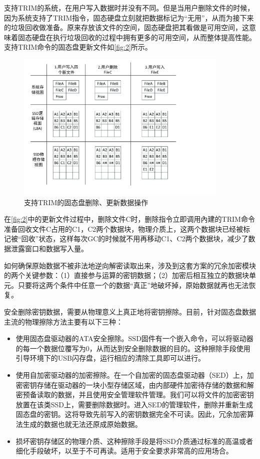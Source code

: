 支持TRIM的系统，在用户写入数据时并没有不同。但是当用户删除文件的时候，因为系统支持了TRIM指令，固态硬盘立刻就把数据标记为“无用”，从而为接下来的垃圾回收做准备。原来存放该文件的空间，固态硬盘把其看做是可用空间，这意味着固态硬盘在执行垃圾回收的过程中拥有更多的可用空间，从而整体提高性能。支持TRIM命令的固态盘更新文件如\autoref{fig:2}所示。
\begin{figure}[H]
	\centering
	\includegraphics[width=4in]{Pics/trim.pdf}
	\caption{支持TRIM的固态盘删除、更新数据操作}\label{fig:2}
\end{figure}
在\autoref{fig:2}中的更新文件过程中，删除文件C时，删除指令立即调用內建的TRIM命令准备回收文件C占用的C1，C2两个数据块，物理介质上，这两个数据块已经被标记被“回收”状态，这样每次GC的时候就不用再移动C1、C2两个数据块，减少了数据泄露窗口和数据写入量。


如何确保原始数据不被非法地逆向解密读取出来，涉及到这套方案的冗余加密模块的两个关键参数：（1）直接参与运算的密钥数据；（2）加密后相互独立的数据块单元。只要将这两个条件中任意一个的数据“真正”地破坏掉，原始数据就再也无法恢复。


安全删除密钥数据，需要从物理意义上真正地将密钥擦除。目前，针对固态盘数据主流的物理擦除方法主要有以下三种：
\begin{itemize}
	\item 使用固态盘驱动器的ATA安全擦除。SSD固件有一个嵌入命令，可以将驱动器的每一个数据位覆写为0，从而达到安全删除数据的目的。这种擦除手段使用引导环境下的USB闪存盘，运行相应的清除工具即可以进行。
	\item 使用自加密驱动器的加密擦除。在一个自加密的固态盘驱动器（SED）上，加密密钥存储在驱动器的一块小型存储区域，由内部硬件加密待存储的数据和解密预备读取的数据，并且使用安全管理软件管理。我们可以将文件的加密密钥放置在该类SSD上，需要删除数据时。进入SED的管理软件，删除并重新生成固态盘的密钥。这将导致先前写入的密钥数据完全不可读。因此，冗余加密算法生成的数据也就无法还原成原始数据。
	\item 损坏密钥存储区的物理介质、这种擦除手段是将SSD介质通过标准的高温或者细化手段破坏，以至于不可再读。适用于安全要求非常高的应用场合。
\end{itemize}



